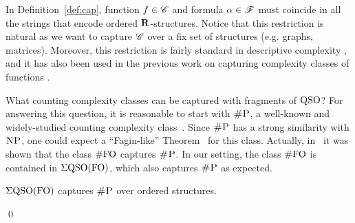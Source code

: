 In Definition~\ref{def:cap}, function $f \in \mathscr{C}$ and formula $\alpha \in \mathscr{F}$ must coincide in all the strings that encode ordered $\mathbf{R}$-structures. Notice that this restriction is natural as we want to capture %
$\mathscr{C}$ over a fix set of structures (e.g. graphs, matrices).
Moreover, this restriction is fairly standard in descriptive complexity \cite{immerman1999descriptive,L04}, and it has also been used in the previous work on capturing complexity classes of functions \cite{SalujaST95,ComptonG96}.

What counting complexity classes can be captured with fragments of ${\rm QSO}$?
For answering this question, it is reasonable to start with $\text{\sc \#P}$, a well-known and widely-studied counting complexity class~\cite{arora2009computational}. 
Since $\text{\sc \#P}$ has a strong similarity with $\text{\sc NP}$, one could expect a ``Fagin-like'' Theorem~\cite{F75} for this class. 
Actually, in~\cite{SalujaST95} it was shown that the class $\#{\rm FO}$ captures $\text{\sc \#P}$.
In our setting, the class $\#{\rm FO}$ is contained in $\Sigma{\rm QSO}({\rm FO})$, which also captures $\text{\sc \#P}$ as expected.
 
\begin{prop} \label{prop:capture-shP}
	$\Sigma{\rm QSO}({\rm FO})$ captures $\text{\sc \#P}$ over ordered structures.
\end{prop}
\proof
 
\qed

